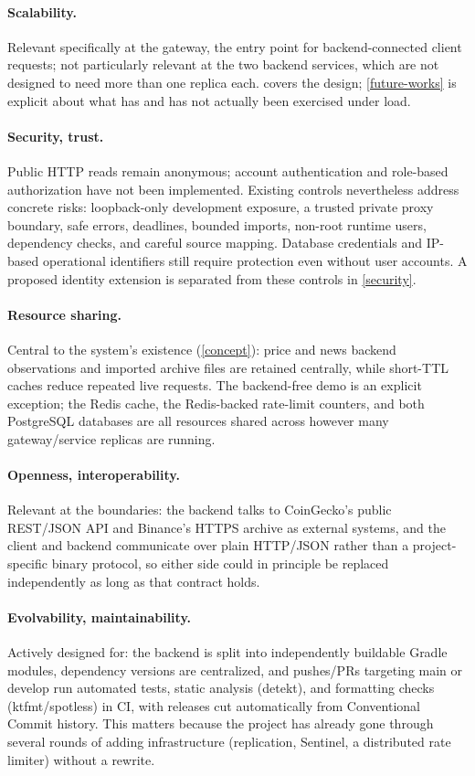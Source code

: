 \documentclass{scrartcl}
\begin{document}
\paragraph{Scalability.} Relevant specifically at the gateway, the entry point for backend-connected
client requests; not particularly relevant at the two backend services, which
are not designed to need more than one replica each.  covers the design;
\cref{future-works} is explicit about what has and has not actually been exercised under load.

\paragraph{Security, trust.} Public HTTP reads remain anonymous; account authentication and
role-based authorization have not been implemented. Existing controls nevertheless address
concrete risks: loopback-only development exposure, a trusted private proxy boundary, safe errors,
deadlines, bounded imports, non-root runtime users, dependency checks, and careful source mapping.
Database credentials and IP-based operational identifiers still require protection even without
user accounts. A proposed identity extension is separated from these controls in \cref{security}.

\paragraph{Resource sharing.} Central to the system's existence (\cref{concept}): price and news
backend observations and imported archive files are retained centrally, while short-TTL
caches reduce repeated live requests. The backend-free demo is an explicit exception; the Redis cache, the Redis-backed rate-limit counters, and both PostgreSQL
databases are all resources shared across however many gateway/service replicas are running.

\paragraph{Openness, interoperability.} Relevant at the boundaries: the backend talks to
CoinGecko's public REST/JSON API and Binance's HTTPS archive as external systems, and the client
and backend communicate over plain HTTP/JSON rather than a project-specific binary protocol, so
either side could in principle be replaced independently as long as that contract holds.

\paragraph{Evolvability, maintainability.} Actively designed for: the backend is split into
independently buildable Gradle modules, dependency versions are centralized, and pushes/PRs targeting main or develop run
automated tests, static analysis (detekt), and formatting checks (ktfmt/spotless) in CI, with
releases cut automatically from Conventional Commit history. This matters because the project
has already gone through several rounds of adding infrastructure (replication, Sentinel, a
distributed rate limiter) without a rewrite.
\end{document}
